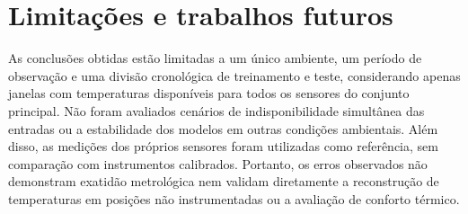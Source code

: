 



\section{Limitações e trabalhos futuros}
\label{sec:trabalhos_futuros}

As conclusões obtidas estão limitadas a um único ambiente,
um período de observação e uma divisão cronológica de
treinamento e teste, considerando apenas janelas com
temperaturas disponíveis para todos os sensores do conjunto
principal. Não foram avaliados cenários de indisponibilidade
simultânea das entradas ou a estabilidade dos modelos em
outras condições ambientais. Além disso, as medições dos
próprios sensores foram utilizadas como referência,
sem comparação com instrumentos calibrados. Portanto,
os erros observados não demonstram exatidão metrológica
nem validam diretamente a reconstrução de temperaturas
em posições não instrumentadas ou a avaliação de conforto
térmico.

